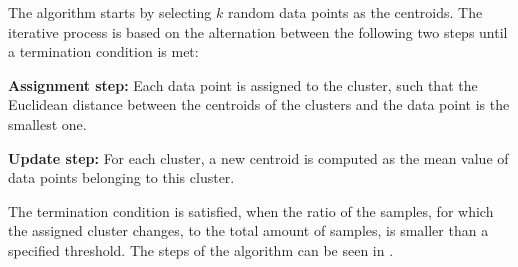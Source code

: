The algorithm starts by selecting $k$ random data points as the centroids. The iterative process is based on the alternation between the following two steps until a termination condition is met:
\begin{description}
    \item{\textbf{Assignment step:}} Each data point is assigned to the cluster, such that the Euclidean distance between the centroids of the clusters and the data point is the smallest one.
    \item{\textbf{Update step:}} For each cluster, a new centroid is computed as the mean value of data points belonging to this cluster.
\end{description}

The termination condition is satisfied, when the ratio of the samples, for which the assigned cluster changes, to the total amount of samples, is smaller than a specified threshold. The steps of the algorithm can be seen in .
